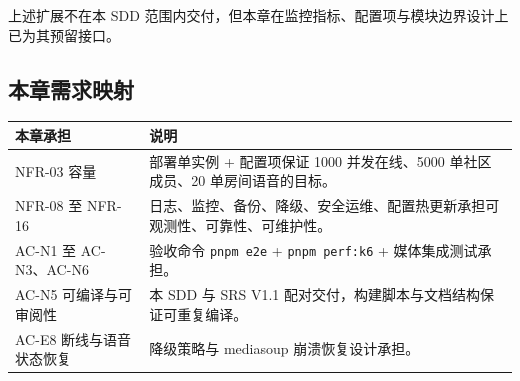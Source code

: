 上述扩展不在本 SDD 范围内交付，但本章在监控指标、配置项与模块边界设计上已为其预留接口。

\subsection{本章需求映射}
\noindent\begin{tabularx}{\textwidth}{L{3cm}Y}
  \toprule
  本章承担 & 说明 \\
  \midrule
  NFR-03 容量 & 部署单实例 + 配置项保证 1000 并发在线、5000 单社区成员、20 单房间语音的目标。 \\
  NFR-08 至 NFR-16 & 日志、监控、备份、降级、安全运维、配置热更新承担可观测性、可靠性、可维护性。 \\
  AC-N1 至 AC-N3、AC-N6 & 验收命令 \texttt{pnpm e2e} + \texttt{pnpm perf:k6} + 媒体集成测试承担。 \\
  AC-N5 可编译与可审阅性 & 本 SDD 与 SRS V1.1 配对交付，构建脚本与文档结构保证可重复编译。 \\
  AC-E8 断线与语音状态恢复 & 降级策略与 mediasoup 崩溃恢复设计承担。 \\
  \bottomrule
\end{tabularx}
